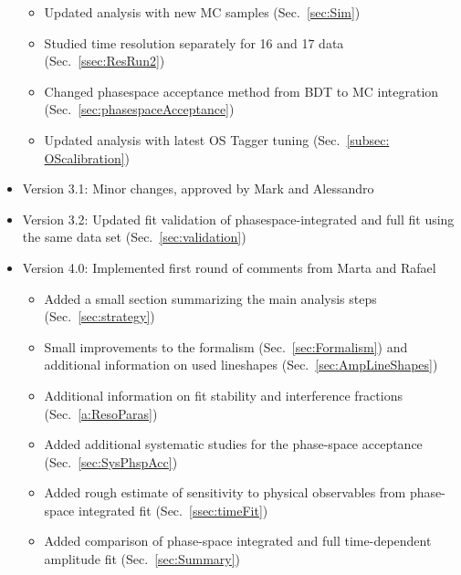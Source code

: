 \begin{itemize}
\begin{itemize}
		\item Updated analysis with new MC samples   (Sec.~\ref{sec:Sim})
	
		\item Studied time resolution separately for 16 and 17 data (Sec.~\ref{ssec:ResRun2}) 		
		
		\item Changed phasespace acceptance method from BDT to MC integration (Sec.~\ref{sec:phasespaceAcceptance}) 

		\item Updated analysis with latest OS Tagger tuning   (Sec.~\ref{subsec: OScalibration}) 		
		
	\end{itemize}
	
	\item Version 3.1:   Minor changes, approved by Mark and  Alessandro

	\item Version 3.2:   Updated fit validation of phasespace-integrated and full fit using the same data set (Sec.~\ref{sec:validation})

	\item Version 4.0:   Implemented first round of comments from Marta and Rafael
	\begin{itemize}
		\item Added a small section summarizing the main analysis steps (Sec.~\ref{sec:strategy})
		\item Small improvements to the formalism (Sec.~\ref{sec:Formalism}) and additional information on used lineshapes (Sec.~\ref{sec:AmpLineShapes})
		\item Additional information on fit stability and interference fractions (Sec.~\ref{a:ResoParas})
		\item Added additional systematic studies for the phase-space acceptance (Sec.~\ref{sec:SysPhspAcc})
		\item Added rough estimate of sensitivity to physical observables from phase-space integrated fit  (Sec.~\ref{ssec:timeFit})
		\item Added comparison of phase-space integrated and full time-dependent amplitude fit (Sec.~\ref{sec:Summary})
	\end{itemize}

\end{itemize}

